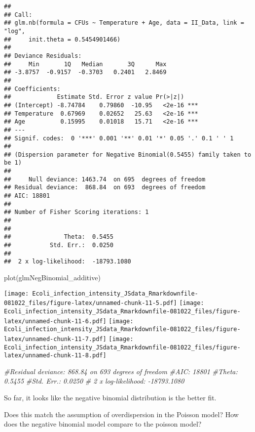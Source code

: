 \documentclass[
]{article}
\newenvironment{Shaded}{\begin{snugshade}}{\end{snugshade}}
\newcommand{\CommentTok}[1]{\textcolor[rgb]{0.56,0.35,0.01}{\textit{#1}}}
\newcommand{\FunctionTok}[1]{\textcolor[rgb]{0.00,0.00,0.00}{#1}}
\newcommand{\NormalTok}[1]{#1}
\begin{document}
\begin{verbatim}
## 
## Call:
## glm.nb(formula = CFUs ~ Temperature + Age, data = II_Data, link = "log", 
##     init.theta = 0.5454901466)
## 
## Deviance Residuals: 
##     Min       1Q   Median       3Q      Max  
## -3.8757  -0.9157  -0.3703   0.2401   2.8469  
## 
## Coefficients:
##             Estimate Std. Error z value Pr(>|z|)    
## (Intercept) -8.74784    0.79860  -10.95   <2e-16 ***
## Temperature  0.67969    0.02652   25.63   <2e-16 ***
## Age          0.15995    0.01018   15.71   <2e-16 ***
## ---
## Signif. codes:  0 '***' 0.001 '**' 0.01 '*' 0.05 '.' 0.1 ' ' 1
## 
## (Dispersion parameter for Negative Binomial(0.5455) family taken to be 1)
## 
##     Null deviance: 1463.74  on 695  degrees of freedom
## Residual deviance:  868.84  on 693  degrees of freedom
## AIC: 18801
## 
## Number of Fisher Scoring iterations: 1
## 
## 
##               Theta:  0.5455 
##           Std. Err.:  0.0250 
## 
##  2 x log-likelihood:  -18793.1080
\end{verbatim}

\begin{Shaded}
\begin{Highlighting}[]
\FunctionTok{plot}\NormalTok{(glmNegBinomial\_additive)}
\end{Highlighting}
\end{Shaded}

\texttt{[image: Ecoli\_infection\_intensity\_JSdata\_Rmarkdownfile-081022\_files/figure-latex/unnamed-chunk-11-5.pdf]}
\texttt{[image: Ecoli\_infection\_intensity\_JSdata\_Rmarkdownfile-081022\_files/figure-latex/unnamed-chunk-11-6.pdf]}
\texttt{[image: Ecoli\_infection\_intensity\_JSdata\_Rmarkdownfile-081022\_files/figure-latex/unnamed-chunk-11-7.pdf]}
\texttt{[image: Ecoli\_infection\_intensity\_JSdata\_Rmarkdownfile-081022\_files/figure-latex/unnamed-chunk-11-8.pdf]}

\begin{Shaded}
\begin{Highlighting}[]
\CommentTok{\#Residual deviance:  868.84  on 693  degrees of freedom}
\CommentTok{\#AIC: 18801}
\CommentTok{\#Theta:  0.5455 }
\CommentTok{\#Std. Err.:  0.0250}
\CommentTok{\# 2 x log{-}likelihood:  {-}18793.1080 }
\end{Highlighting}
\end{Shaded}

So far, it looks like the negative binomial distribution is the better
fit.

Does this match the assumption of overdispersion in the Poisson model?
How does the negative binomial model compare to the poisson model?
\end{document}
